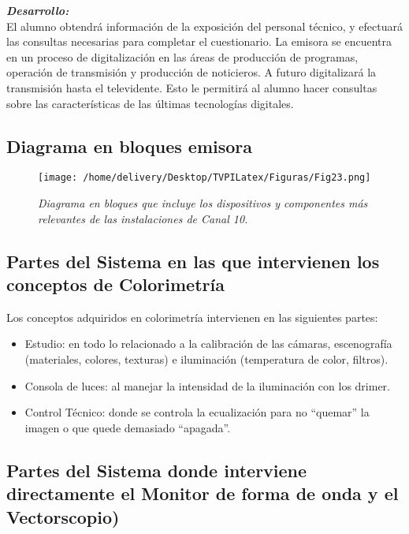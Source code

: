 \documentclass[a4paper,11pt]{article} %
\begin{document}
\textbf{\emph{\large{Desarrollo:}}}
\\

El alumno obtendrá información de la exposición del personal técnico, y
efectuará las consultas necesarias para completar el cuestionario.
La emisora se encuentra en un proceso de digitalización en las áreas de
producción de programas, operación de transmisión y producción de
noticieros. A futuro digitalizará la transmisión hasta el televidente.
Esto le permitirá al alumno hacer consultas sobre las características de
las últimas tecnologías digitales.


\newpage
\subsection{Diagrama en bloques emisora}

\begin{figure}[h!] 
\centering
\texttt{[image: /home/delivery/Desktop/TVPILatex/Figuras/Fig23.png]}
\caption{\emph{Diagrama en bloques que incluye los dispositivos y
componentes m\'as relevantes de las instalaciones de Canal 10.}}
\end{figure}

\subsection{Partes del Sistema en las que intervienen los conceptos de
Colorimetr\'ia}

Los conceptos adquiridos en colorimetría intervienen en las siguientes
partes:

\begin{itemize}
 \item Estudio: en todo lo relacionado a la calibración de las cámaras,
escenografía (materiales, colores, texturas) e iluminación (temperatura
de color, filtros). 
 \item Consola de luces: al manejar la intensidad de la iluminación con
los drimer.
 \item Control Técnico: donde se controla la ecualización para no
“quemar” la imagen o que quede demasiado “apagada”.
\end{itemize}

\subsection{Partes del Sistema donde interviene directamente el
Monitor de forma de onda y el Vectorscopio)}
\end{document}
